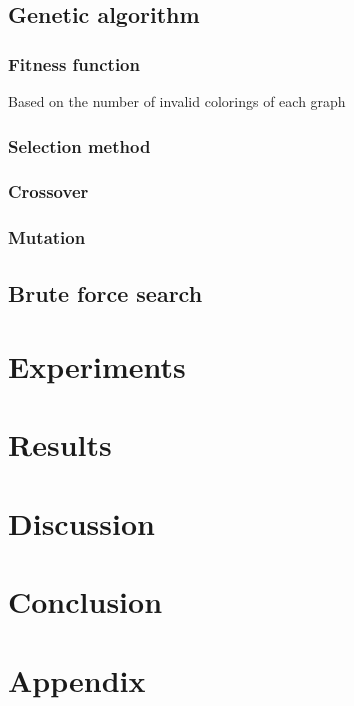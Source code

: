 \documentclass[a4paper]{report}
\begin{document}
			
		\section{Genetic algorithm}
			\subsection{Fitness function}
			Based on the number of invalid colorings of each graph
			\subsection{Selection method}
			\subsection{Crossover}
			\subsection{Mutation}
		
		\section{Brute force search}
		
		
	\chapter{Experiments}
		
	\chapter{Results}
	
	\chapter{Discussion}
	
	\chapter{Conclusion}
	
	
	
	
	
	\appendix
	\chapter*{Appendix}
\end{document}

